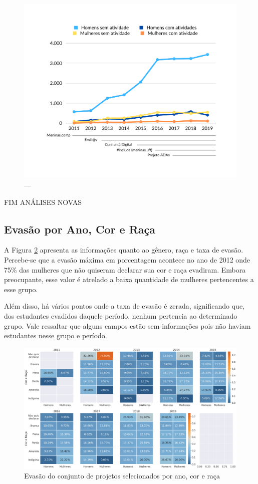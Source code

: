 \begin{figure}[H]
\centering
\includegraphics[width=1\textwidth]{Figuras/quantidadeatividadeextra.png}
\caption{---}
\label{fig:quantidadeatividadeextra}
\end{figure}


FIM ANÁLISES NOVAS


\subsection{Evasão por Ano, Cor e Raça}\label{sub:calorCorERaca}
A Figura \ref{fig:calorCorRaca} apresenta as informações quanto ao gênero, raça e taxa de evasão. Percebe-se que a evasão máxima em porcentagem acontece no ano de 2012 onde 75\% das mulheres que não quiseram declarar sua cor e raça evadiram. Embora preocupante, esse valor é atrelado a baixa quantidade de mulheres pertencentes a esse grupo.

Além disso, há vários pontos onde a taxa de evasão é zerada, significando que, dos estudantes evadidos daquele período, nenhum pertencia ao determinado grupo. Vale ressaltar que alguns campos estão sem informações pois não haviam estudantes nesse grupo e período.


\begin{figure}[H]
\centering
\includegraphics[width=1\textwidth]{Figuras/calorCorRaca.png}
\caption{Evasão do conjunto de projetos selecionados por ano, cor e raça}
\label{fig:calorCorRaca}
\end{figure}

